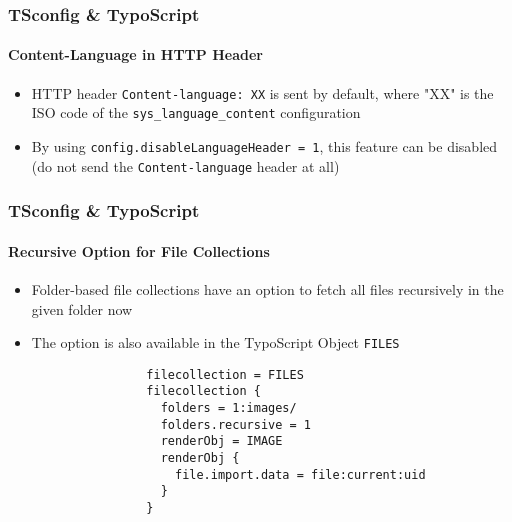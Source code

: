 \begin{frame}[fragile]
	\frametitle{TSconfig \& TypoScript}
	\framesubtitle{Content-Language in HTTP Header}

	\begin{itemize}

		\item HTTP header \texttt{Content-language: XX} is sent by default, where "XX" is the ISO code of the
			\texttt{sys\_language\_content} configuration

		\item By using \texttt{config.disableLanguageHeader = 1}, this feature can be disabled
			(do not send the \texttt{Content-language} header at all)

	\end{itemize}

\end{frame}


\begin{frame}[fragile]
	\frametitle{TSconfig \& TypoScript}
	\framesubtitle{Recursive Option for File Collections}

	\begin{itemize}

		\item Folder-based file collections have an option to fetch all files recursively in the given folder now

		\item The option is also available in the TypoScript Object \texttt{FILES}

			\begin{lstlisting}
				filecollection = FILES
				filecollection {
				  folders = 1:images/
				  folders.recursive = 1
				  renderObj = IMAGE
				  renderObj {
				    file.import.data = file:current:uid
				  }
				}
			\end{lstlisting}

	\end{itemize}

\end{frame}

